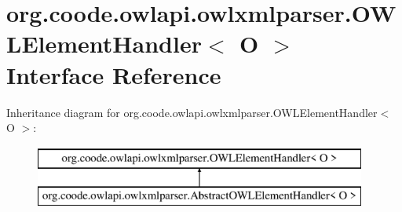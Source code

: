 \hypertarget{interfaceorg_1_1coode_1_1owlapi_1_1owlxmlparser_1_1_o_w_l_element_handler_3_01_o_01_4}{\section{org.\-coode.\-owlapi.\-owlxmlparser.\-O\-W\-L\-Element\-Handler$<$ O $>$ Interface Reference}
\label{interfaceorg_1_1coode_1_1owlapi_1_1owlxmlparser_1_1_o_w_l_element_handler_3_01_o_01_4}
}
Inheritance diagram for org.\-coode.\-owlapi.\-owlxmlparser.\-O\-W\-L\-Element\-Handler$<$ O $>$\-:\begin{figure}[H]
\begin{center}
\leavevmode
\includegraphics[height=2.000000cm]{interfaceorg_1_1coode_1_1owlapi_1_1owlxmlparser_1_1_o_w_l_element_handler_3_01_o_01_4}
\end{center}
\end{figure}
